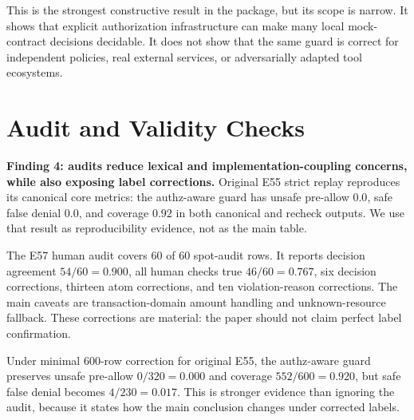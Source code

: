 \documentclass[10pt,twocolumn]{article}
\begin{document}
\begin{table}[t]
\centering
\small
\caption{E55-v2 strict label-hidden pre-commit authorization result. CI columns are Wilson intervals from the local result artifact.}
\label{tab:e55v2}
\end{table}

This is the strongest constructive result in the package, but its scope is narrow. It shows that explicit authorization infrastructure can make many local mock-contract decisions decidable. It does not show that the same guard is correct for independent policies, real external services, or adversarially adapted tool ecosystems.

\section{Audit and Validity Checks}

\textbf{Finding 4: audits reduce lexical and implementation-coupling concerns, while also exposing label corrections.} Original E55 strict replay reproduces its canonical core metrics: the authz-aware guard has unsafe pre-allow $0.0$, safe false denial $0.0$, and coverage $0.92$ in both canonical and recheck outputs. We use that result as reproducibility evidence, not as the main table.

The E57 human audit covers 60 of 60 spot-audit rows. It reports decision agreement $54/60=0.900$, all human checks true $46/60=0.767$, six decision corrections, thirteen atom corrections, and ten violation-reason corrections. The main caveats are transaction-domain amount handling and unknown-resource fallback. These corrections are material: the paper should not claim perfect label confirmation.

Under minimal 600-row correction for original E55, the authz-aware guard preserves unsafe pre-allow $0/320=0.000$ and coverage $552/600=0.920$, but safe false denial becomes $4/230=0.017$. This is stronger evidence than ignoring the audit, because it states how the main conclusion changes under corrected labels.
\end{document}
